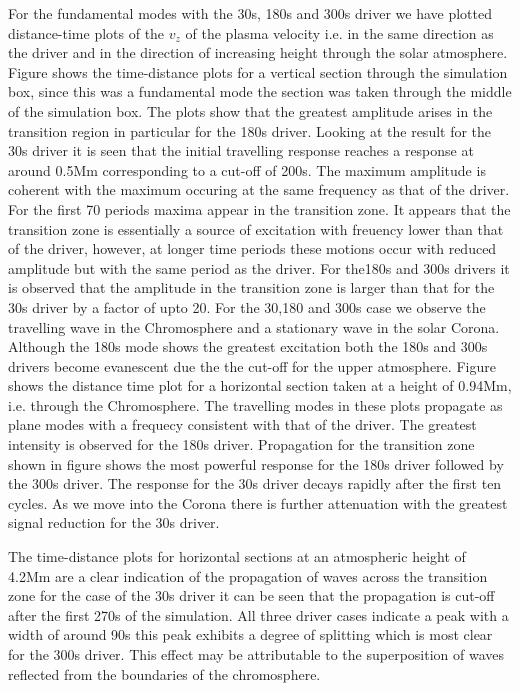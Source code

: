 \documentclass[authoryear,final,1p]{elsarticle}
\begin{document}
For the fundamental modes with the 30s, 180s and 300s driver we have plotted distance-time plots of the $v_z$ of the plasma velocity i.e. in the same direction as the driver and in the direction of increasing height through the solar atmosphere.  Figure
 shows the time-distance plots for a vertical section through the simulation box, since this was a fundamental mode the section was taken through the middle of the simulation box. The plots show that the greatest amplitude arises in the transition region in particular for the 180s driver. Looking at the result for the 30s driver it is seen that the initial travelling response reaches a response at around 0.5Mm corresponding to a cut-off of 200s. The maximum amplitude is coherent with the maximum occuring at the same frequency as that of the driver. For the first 70 periods maxima appear in the transition zone. It appears that the transition zone is essentially a source of excitation with freuency lower than that of the driver, however, at longer time periods these motions occur with reduced amplitude but with the same period as the driver. For the180s and 300s drivers it is observed that the amplitude in the transition zone is larger than that for the 30s driver by a factor of upto 20. For the 30,180 and 300s case we observe the travelling wave in the Chromosphere and a stationary wave in the solar Corona. Although the 180s mode shows the greatest excitation both the 180s and 300s drivers become evanescent due the the cut-off for the upper atmosphere. Figure  shows the distance time plot for a horizontal section taken at a height of 0.94Mm, i.e. through the Chromosphere. The travelling modes in these plots propagate as plane modes with a frequecy consistent with that of the driver. The greatest intensity is observed for the 180s driver. Propagation for the transition zone shown in figure  shows the most powerful response for the 180s driver followed by the 300s driver. The response for the 30s driver decays rapidly after the first ten cycles. As we move into the Corona there is further attenuation with the greatest signal reduction for the 30s driver.

The time-distance plots  for horizontal sections at an atmospheric height of 4.2Mm are a clear indication of the propagation of waves across the transition zone for the case of the 30s driver it can be seen that  the propagation is cut-off after the first 270s of the simulation. All three driver cases indicate a peak with a width of around 90s this peak exhibits a degree of splitting which is most clear for the 300s driver.  This effect may be attributable to the superposition of waves reflected from the boundaries of the chromosphere.
\end{document}
